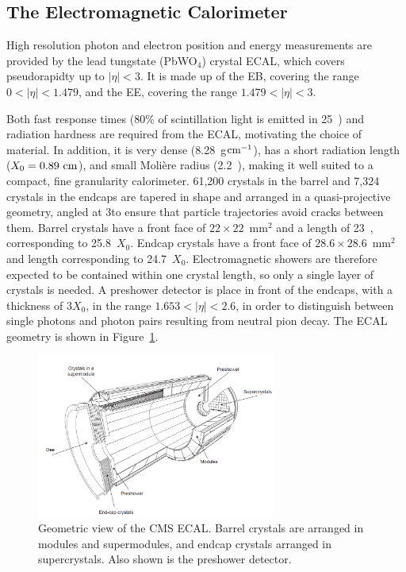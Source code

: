 
\subsection{The Electromagnetic Calorimeter}
High resolution photon and electron position and energy measurements are provided by the lead tungstate (PbWO$_{4}$) crystal \ac{ECAL}, which covers pseudorapidty up to $|\eta|<3$.
It is made up of the \ac{EB}, covering the range $0<|\eta|<1.479$,
and the \ac{EE}, covering the range $1.479<|\eta|<3$.

Both fast response times (80\% of scintillation light is emitted in 25~\ns) and radiation hardness are required from the \ac{ECAL}, motivating the choice of material.
In addition, it is very dense (8.28~g$\mathrm{cm}^{-1}$), has a short radiation length ($X_{0} = 0.89~\mathrm{cm}$), and small Moli\`{e}re radius (2.2~\cm), making it well suited to a compact, fine granularity calorimeter.
61,200 crystals in the barrel and 7,324 crystals in the endcaps are tapered in shape and arranged in a quasi-projective geometry, angled at 3\deg to ensure that particle trajectories avoid cracks between them.
Barrel crystals have a front face of $22 \times 22$~mm$^{2}$ and a length of 23~\cm, corresponding to 25.8~$X_{0}$. 
Endcap crystals have a front face of $28.6 \times 28.6$~mm$^{2}$ and length corresponding to 24.7~$X_{0}$.
Electromagnetic showers are therefore expected to be contained within one crystal length, so only a single layer of crystals is needed. 
A preshower detector is place in front of the endcaps, with a thickness of $3X_{0}$, in the range $1.653<|\eta|<2.6$, in order to distinguish between single photons and photon pairs resulting from neutral pion decay. 
The \ac{ECAL} geometry is shown in Figure~\ref{fig:CMSecal}.

\begin{figure}[htbp]
  \begin{center}
  \includegraphics[width=0.7\textwidth]{Figures/detector/cmsECAL}
  \caption{Geometric view of the \ac{CMS} \ac{ECAL}. Barrel crystals are arranged in modules and supermodules, and endcap crystals arranged in supercrystals. Also shown is the preshower detector.
}
  \label{fig:CMSecal}
  \end{center}
\end{figure}

